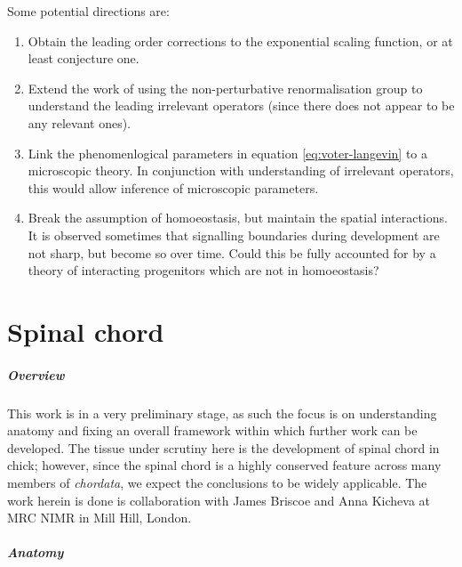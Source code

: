 \documentclass[10pt,english]{report}
\begin{document}
Some potential directions are:

\begin{enumerate}

\item Obtain the leading order corrections to the exponential scaling function, or at least conjecture one.

\item Extend the work of \citet{canet05} using the non-perturbative renormalisation group to understand the leading irrelevant operators (since there does not appear to be any relevant ones).

\item Link the phenomenlogical parameters in equation \eqref{eq:voter-langevin} to a microscopic theory. In conjunction with understanding of irrelevant operators, this would allow inference of microscopic parameters.

\item Break the assumption of homoeostasis, but maintain the spatial interactions. It is observed sometimes that signalling boundaries during development are not sharp, but become so over time. Could this be fully accounted for by a theory of interacting progenitors which are not in homoeostasis?

\end{enumerate}

\chapter{Spinal chord}

\paragraph{Overview}

This work is in a very preliminary stage, as such the focus is on understanding anatomy and fixing an overall framework within which further work can be developed. The tissue under scrutiny here is the development of spinal chord in chick; however, since the spinal chord is a highly conserved feature across many members of \emph{chordata}, we expect the conclusions to be widely applicable. The work herein is done is collaboration with James Briscoe and Anna Kicheva at MRC NIMR in Mill Hill, London.

\paragraph{Anatomy}
\end{document}
